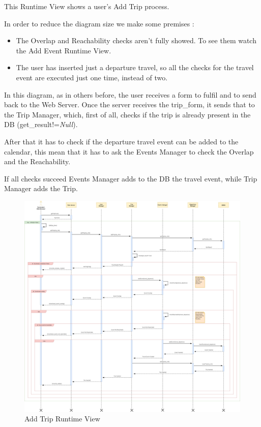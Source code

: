 This Runtime View shows a user's Add Trip process.\par
In order to reduce the diagram size we make some premises :
\begin{itemize}
	\setlength{\leftskip}{1cm}
	\item The Overlap and Reachability checks aren’t fully showed. To see them watch the Add Event Runtime View.
	\item The user has inserted just a departure travel, so all the checks for the travel event are executed just one time, instead of two.
\end{itemize}\par
In this diagram, as in others before, the user receives a form to fulfil and to send back to the Web Server.
Once the server receives the trip\_form, it sends that to the Trip Manager, which, first of all, checks if the trip is already present in the DB (get\_result!=\emph{Null}).\par
After that it has to check if the departure travel event can be added to the calendar, this mean that it has to ask the Events Manager to check the Overlap and the Reachability.\par
If all checks succeed Events Manager adds to the DB the travel event, while Trip Manager adds the Trip.
\begin{figure}[H]
	\centering
	\includegraphics[scale=0.165]{Images/Runtime/Add_Trip}
	\caption{Add Trip Runtime View}
\end{figure}

